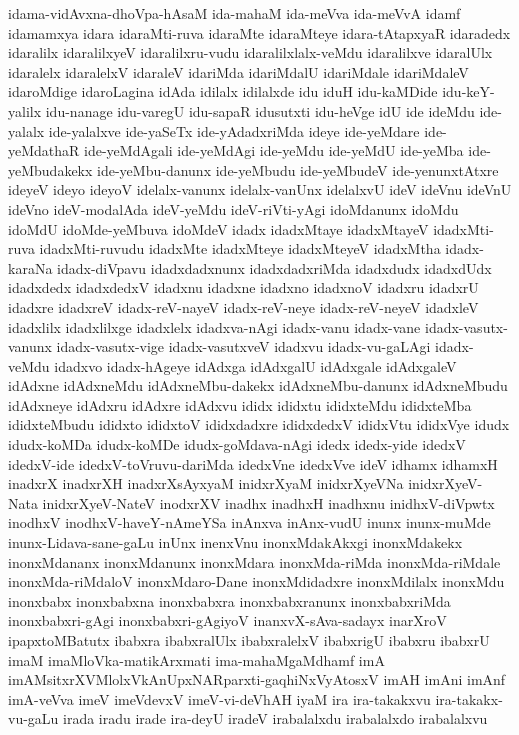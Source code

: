 {idama-vidAvxna-dhoVpa-hAsaM
ida-mahaM
ida-meVva
ida-meVvA
idamf
idamamxya
idara
idaraMti-ruva
idaraMte
idaraMteye
idara-tAtapxyaR
idaradedx
idaralilx
idaralilxyeV
idaralilxru-vudu
idaralilxlalx-veMdu
idaralilxve
idaralUlx
idaralelx
idaralelxV
idaraleV
idariMda
idariMdalU
idariMdale
idariMdaleV
idaroMdige
idaroLagina
idAda
idilalx
idilalxde
idu
iduH
idu-kaMDide
idu-keY-yalilx
idu-nanage
idu-varegU
idu-sapaR
idusutxti
idu-heVge
idU
ide
ideMdu
ide-yalalx
ide-yalalxve
ide-yaSeTx
ide-yAdadxriMda
ideye
ide-yeMdare
ide-yeMdathaR
ide-yeMdAgali
ide-yeMdAgi
ide-yeMdu
ide-yeMdU
ide-yeMba
ide-yeMbudakekx
ide-yeMbu-danunx
ide-yeMbudu
ide-yeMbudeV
ide-yenunxtAtxre
ideyeV
ideyo
ideyoV
idelalx-vanunx
idelalx-vanUnx
idelalxvU
ideV
ideVnu
ideVnU
ideVno
ideV-modalAda
ideV-yeMdu
ideV-riVti-yAgi
idoMdanunx
idoMdu
idoMdU
idoMde-yeMbuva
idoMdeV
idadx
idadxMtaye
idadxMtayeV
idadxMti-ruva
idadxMti-ruvudu
idadxMte
idadxMteye
idadxMteyeV
idadxMtha
idadx-karaNa
idadx-diVpavu
idadxdadxnunx
idadxdadxriMda
idadxdudx
idadxdUdx
idadxdedx
idadxdedxV
idadxnu
idadxne
idadxno
idadxnoV
idadxru
idadxrU
idadxre
idadxreV
idadx-reV-nayeV
idadx-reV-neye
idadx-reV-neyeV
idadxleV
idadxlilx
idadxlilxge
idadxlelx
idadxva-nAgi
idadx-vanu
idadx-vane
idadx-vasutx-vanunx
idadx-vasutx-vige
idadx-vasutxveV
idadxvu
idadx-vu-gaLAgi
idadx-veMdu
idadxvo
idadx-hAgeye
idAdxga
idAdxgalU
idAdxgale
idAdxgaleV
idAdxne
idAdxneMdu
idAdxneMbu-dakekx
idAdxneMbu-danunx
idAdxneMbudu
idAdxneye
idAdxru
idAdxre
idAdxvu
ididx
ididxtu
ididxteMdu
ididxteMba
ididxteMbudu
ididxto
ididxtoV
ididxdadxre
ididxdedxV
ididxVtu
ididxVye
idudx
idudx-koMDa
idudx-koMDe
idudx-goMdava-nAgi
idedx
idedx-yide
idedxV
idedxV-ide
idedxV-toVruvu-dariMda
idedxVne
idedxVve
ideV
idhamx
idhamxH
inadxrX
inadxrXH
inadxrXsAyxyaM
inidxrXyaM
inidxrXyeVNa
inidxrXyeV-Nata
inidxrXyeV-NateV
inodxrXV
inadhx
inadhxH
inadhxnu
inidhxV-diVpwtx
inodhxV
inodhxV-haveY-nAmeYSa
inAnxva
inAnx-vudU
inunx
inunx-muMde
inunx-Lidava-sane-gaLu
inUnx
inenxVnu
inonxMdakAkxgi
inonxMdakekx
inonxMdananx
inonxMdanunx
inonxMdara
inonxMda-riMda
inonxMda-riMdale
inonxMda-riMdaloV
inonxMdaro-Dane
inonxMdidadxre
inonxMdilalx
inonxMdu
inonxbabx
inonxbabxna
inonxbabxra
inonxbabxranunx
inonxbabxriMda
inonxbabxri-gAgi
inonxbabxri-gAgiyoV
inanxvX-sAva-sadayx
inarXroV
ipapxtoMBatutx
ibabxra
ibabxralUlx
ibabxralelxV
ibabxrigU
ibabxru
ibabxrU
imaM
imaMloVka-matikArxmati
ima-mahaMgaMdhamf
imA
imAMsitxrXVMlolxVkAnUpxNARparxti-gaqhiNxVyAtosxV
imAH
imAni
imAnf
imA-veVva
imeV
imeVdevxV
imeV-vi-deVhAH
iyaM
ira
ira-takakxvu
ira-takakx-vu-gaLu
irada
iradu
irade
ira-deyU
iradeV
irabalalxdu
irabalalxdo
irabalalxvu
}
